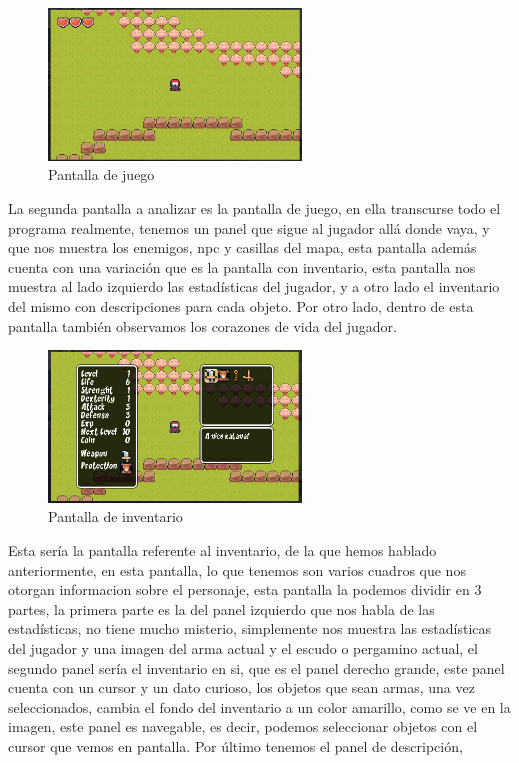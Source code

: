\documentclass[a4paper]{article}
\begin{document}
\begin{figure}[!ht]
    \centering
    \includegraphics[width=0.6\textwidth]{Images/pantalla2tfg.png}
    \caption{Pantalla de juego}
    \label{fig:pantalla2}
\end{figure}
La segunda pantalla a analizar es la pantalla de juego, en ella transcurse todo el programa realmente, tenemos un panel que sigue al jugador allá donde vaya, y que nos muestra los enemigos, npc y casillas del mapa, esta pantalla además cuenta con una variación que es la pantalla con inventario, esta pantalla nos muestra al lado izquierdo las estadísticas del jugador, y a otro lado el inventario del mismo con descripciones para cada objeto.
Por otro lado, dentro de esta pantalla también observamos los corazones de vida del jugador.\\
\begin{figure}[!ht]
    \centering
    \includegraphics[width=0.6\textwidth]{Images/pantalla3tfg.png}
    \caption{Pantalla de inventario}
    \label{fig:pantalla3}
\end{figure}
Esta sería la pantalla referente al inventario, de la que hemos hablado anteriormente, en esta pantalla, lo que tenemos son varios cuadros que nos otorgan informacion sobre el personaje, esta pantalla la podemos dividir en 3 partes,
la primera parte es la del panel izquierdo que nos habla de las estadísticas, no tiene mucho misterio, simplemente nos muestra las estadísticas del jugador y una imagen del arma actual y el escudo o pergamino actual, el segundo panel sería el inventario en si, que es el panel derecho grande,
este panel cuenta con un cursor y un dato curioso, los objetos que sean armas, una vez seleccionados, cambia el fondo del inventario a un color amarillo, como se ve en la imagen, este panel es navegable, es decir, podemos seleccionar objetos con el cursor que vemos en pantalla. Por último tenemos el panel de descripción, 
\end{document}
